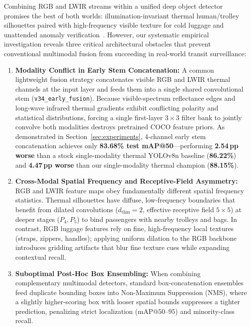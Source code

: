 \documentclass[journal,twoside,web]{ieeecolor}
\begin{document}
Combining RGB and LWIR streams within a unified deep object detector promises the best of both worlds: illumination-invariant thermal human/trolley silhouettes paired with high-frequency visible texture for cold luggage and unattended anomaly verification~\cite{jia2021llvip,liu2022target}. However, our systematic empirical investigation reveals three critical architectural obstacles that prevent conventional multimodal fusion from succeeding in real-world transit surveillance:
\begin{enumerate}
    \item \textbf{Modality Conflict in Early Stem Concatenation:} A common lightweight fusion strategy concatenates visible RGB and LWIR thermal channels at the input layer and feeds them into a single shared convolutional stem (\texttt{v34\_early\_fusion}). Because visible-spectrum reflectance edges and long-wave infrared thermal gradients exhibit conflicting polarity and statistical distributions, forcing a single first-layer $3\times 3$ filter bank to jointly convolve both modalities destroys pretrained COCO feature priors. As demonstrated in Section~\ref{sec:experiments}, 4-channel early stem concatenation achieves only \textbf{83.68\% test mAP@50}---performing \textbf{2.54\,pp worse} than a stock single-modality thermal YOLOv8n baseline (\textbf{86.22\%}) and \textbf{4.47\,pp worse} than our single-modality thermal champion (\textbf{88.15\%}).
    \item \textbf{Cross-Modal Spatial Frequency and Receptive-Field Asymmetry:} RGB and LWIR feature maps obey fundamentally different spatial frequency statistics. Thermal silhouettes have diffuse, low-frequency boundaries that benefit from dilated convolutions ($d_{\text{thm}}=2$, effective receptive field $5\times 5$) at deeper stages ($P_4, P_5$) to bind passengers with nearby trolleys and bags. In contrast, RGB luggage features rely on fine, high-frequency local textures (straps, zippers, handles); applying uniform dilation to the RGB backbone introduces gridding artifacts that blur fine texture cues while expanding contextual recall.
    \item \textbf{Suboptimal Post-Hoc Box Ensembling:} When combining complementary multimodal detectors, standard box-concatenation ensembles feed duplicate bounding boxes into Non-Maximum Suppression (NMS), where a slightly higher-scoring box with looser spatial bounds suppresses a tighter prediction, penalizing strict localization ($\text{mAP@50--95}$) and minority-class recall.
\end{enumerate}
\end{document}
